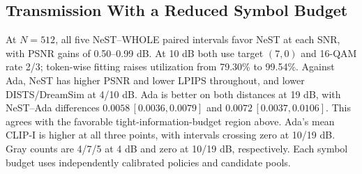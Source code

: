 \subsection{Transmission With a Reduced Symbol Budget}

At $N=512$, all five NeST--WHOLE paired intervals favor NeST at each SNR, with PSNR gains of 0.50--0.99 dB. At 10 dB both use target $(7,0)$ and 16-QAM rate 2/3; token-wise fitting raises utilization from 79.30\% to 99.54\%. Against Ada, NeST has higher PSNR and lower LPIPS throughout, and lower DISTS/DreamSim at 4/10 dB. Ada is better on both distances at 19 dB, with NeST--Ada differences $0.0058\,[0.0036,0.0079]$ and $0.0072\,[0.0037,0.0106]$. This agrees with the favorable tight-information-budget region above. Ada's mean CLIP-I is higher at all three points, with intervals crossing zero at 10/19 dB. Gray counts are 4/7/5 at 4 dB and zero at 10/19 dB, respectively. Each symbol budget uses independently calibrated policies and candidate pools.


